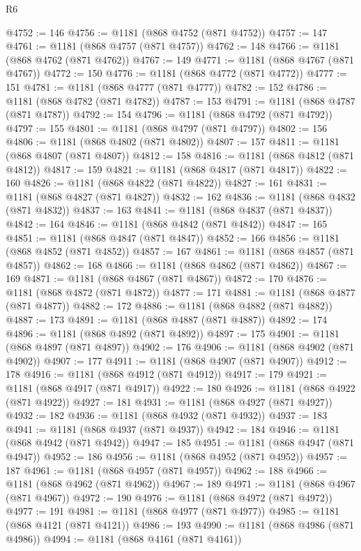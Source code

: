 \begin{lexlean}{R6}
\begin{coremodule}
@4752 := 146
@4756 := @1181 (@868 @4752 (@871 @4752))
@4757 := 147
@4761 := @1181 (@868 @4757 (@871 @4757))
@4762 := 148
@4766 := @1181 (@868 @4762 (@871 @4762))
@4767 := 149
@4771 := @1181 (@868 @4767 (@871 @4767))
@4772 := 150
@4776 := @1181 (@868 @4772 (@871 @4772))
@4777 := 151
@4781 := @1181 (@868 @4777 (@871 @4777))
@4782 := 152
@4786 := @1181 (@868 @4782 (@871 @4782))
@4787 := 153
@4791 := @1181 (@868 @4787 (@871 @4787))
@4792 := 154
@4796 := @1181 (@868 @4792 (@871 @4792))
@4797 := 155
@4801 := @1181 (@868 @4797 (@871 @4797))
@4802 := 156
@4806 := @1181 (@868 @4802 (@871 @4802))
@4807 := 157
@4811 := @1181 (@868 @4807 (@871 @4807))
@4812 := 158
@4816 := @1181 (@868 @4812 (@871 @4812))
@4817 := 159
@4821 := @1181 (@868 @4817 (@871 @4817))
@4822 := 160
@4826 := @1181 (@868 @4822 (@871 @4822))
@4827 := 161
@4831 := @1181 (@868 @4827 (@871 @4827))
@4832 := 162
@4836 := @1181 (@868 @4832 (@871 @4832))
@4837 := 163
@4841 := @1181 (@868 @4837 (@871 @4837))
@4842 := 164
@4846 := @1181 (@868 @4842 (@871 @4842))
@4847 := 165
@4851 := @1181 (@868 @4847 (@871 @4847))
@4852 := 166
@4856 := @1181 (@868 @4852 (@871 @4852))
@4857 := 167
@4861 := @1181 (@868 @4857 (@871 @4857))
@4862 := 168
@4866 := @1181 (@868 @4862 (@871 @4862))
@4867 := 169
@4871 := @1181 (@868 @4867 (@871 @4867))
@4872 := 170
@4876 := @1181 (@868 @4872 (@871 @4872))
@4877 := 171
@4881 := @1181 (@868 @4877 (@871 @4877))
@4882 := 172
@4886 := @1181 (@868 @4882 (@871 @4882))
@4887 := 173
@4891 := @1181 (@868 @4887 (@871 @4887))
@4892 := 174
@4896 := @1181 (@868 @4892 (@871 @4892))
@4897 := 175
@4901 := @1181 (@868 @4897 (@871 @4897))
@4902 := 176
@4906 := @1181 (@868 @4902 (@871 @4902))
@4907 := 177
@4911 := @1181 (@868 @4907 (@871 @4907))
@4912 := 178
@4916 := @1181 (@868 @4912 (@871 @4912))
@4917 := 179
@4921 := @1181 (@868 @4917 (@871 @4917))
@4922 := 180
@4926 := @1181 (@868 @4922 (@871 @4922))
@4927 := 181
@4931 := @1181 (@868 @4927 (@871 @4927))
@4932 := 182
@4936 := @1181 (@868 @4932 (@871 @4932))
@4937 := 183
@4941 := @1181 (@868 @4937 (@871 @4937))
@4942 := 184
@4946 := @1181 (@868 @4942 (@871 @4942))
@4947 := 185
@4951 := @1181 (@868 @4947 (@871 @4947))
@4952 := 186
@4956 := @1181 (@868 @4952 (@871 @4952))
@4957 := 187
@4961 := @1181 (@868 @4957 (@871 @4957))
@4962 := 188
@4966 := @1181 (@868 @4962 (@871 @4962))
@4967 := 189
@4971 := @1181 (@868 @4967 (@871 @4967))
@4972 := 190
@4976 := @1181 (@868 @4972 (@871 @4972))
@4977 := 191
@4981 := @1181 (@868 @4977 (@871 @4977))
@4985 := @1181 (@868 @4121 (@871 @4121))
@4986 := 193
@4990 := @1181 (@868 @4986 (@871 @4986))
@4994 := @1181 (@868 @4161 (@871 @4161))

\end{coremodule}
\end{lexlean}
